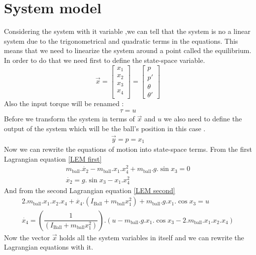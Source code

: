 \documentclass{article}
\begin{document}
\section{System model}
Considering the system with it variable ,we can tell that the system is no a linear system due to the trigonometrical and quadratic terms in the equations.
This means that we need to linearize the system around a point called the equilibrium.
In order to do that we need first to define the state-space variable.
\begin{equation}
	\vec{x} =
	\begin{bmatrix}
		x_1 \\
		x_2 \\
		x_3 \\
		x_4 \\
	\end{bmatrix}=
	\begin{bmatrix}
		p \\
		p' \\
		\theta \\
		\theta '
	\end{bmatrix}
\end{equation}
Also the input torque will be renamed :
\begin{equation}
	\begin{split}
		\tau = u
	\end{split}
\end{equation}
Before we transform the system in terms of $\vec{x}$ and $u$ we also need to define the output of the system which will be the ball's position in this case .
\begin{equation}
	\begin{split}
		\vec{y} = p = x_1
	\end{split}
\end{equation}
Now we can rewrite the equations of motion into state-space terms.
From the first Lagrangian equation \eqref{LEM first}
\begin{equation}
	\begin{split}
		m_{\text{ball}}.\dot{x_2} -  m_{\text{ball}}.x_1.x_4^2 + m_{\text{ball}}.g.\sin{x_3} = 0 \\
		\dot{x_2} =  g.\sin{x_3} - x_1.x_4^2 
	\end{split}
\end{equation}
And from the second Lagrangian equation \eqref{LEM second}
\begin{equation}
	\begin{split}
		2.m_{\text{ball}}.x_1.x_2.x_4 + \dot{x_4}.(I_{\text{Ball}} + m_{\text{ball}} x_1^2) + m_{\text{ball}}.g.x_1.\cos{x_3}  = u \\
		\dot{x_4} = (\dfrac{1}{(I_{\text{Ball}} + m_{\text{ball}} x_1^2)} ). (u - m_{\text{ball}}.g.x_1.\cos{x_3} - 2.m_{\text{ball}}.x_1.x_2.x_4 )
	\end{split}
\end{equation} 
Now the vector $\vec{x}$ holds all the system variables in itself and we can rewrite the Lagrangian equations with it.
\end{document}
